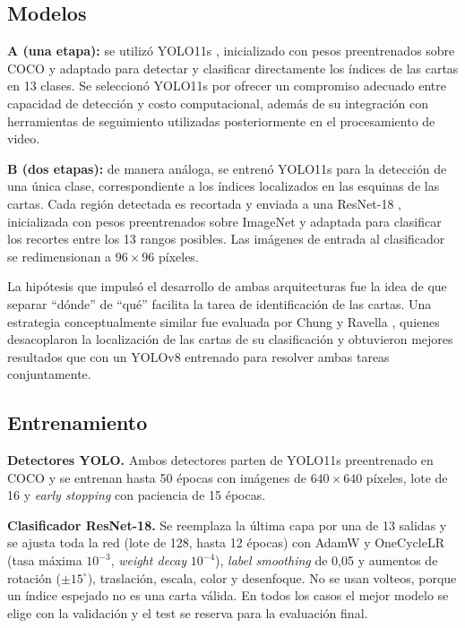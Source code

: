 \documentclass[conference,a4paper]{IEEEtran}
\begin{document}
\subsection{Modelos}
\textbf{A (una etapa):} se utilizó YOLO11s \cite{ultralytics2024,khanam2024}, inicializado con pesos preentrenados sobre COCO y adaptado para detectar y clasificar directamente los índices de las cartas en 13 clases. Se seleccionó YOLO11s por ofrecer un compromiso adecuado entre capacidad de detección y costo computacional, además de su integración con herramientas de seguimiento utilizadas posteriormente en el procesamiento de video.


\textbf{B (dos etapas):} de manera análoga, se entrenó YOLO11s para la detección de una única clase, correspondiente a los índices localizados en las esquinas de las cartas. Cada región detectada es recortada y enviada a una ResNet-18 \cite{he2016}, inicializada con pesos preentrenados sobre ImageNet y adaptada para clasificar los recortes entre los 13 rangos posibles. Las imágenes de entrada al clasificador se redimensionan a \(96 \times 96\) píxeles. 

La hipótesis que impulsó el desarrollo de ambas arquitecturas fue la idea de que separar ``dónde'' de ``qué'' facilita la tarea de identificación de las cartas. Una estrategia conceptualmente similar fue evaluada por Chung y Ravella \cite{chung2024}, quienes desacoplaron la localización de las cartas de su clasificación y obtuvieron mejores resultados que con un YOLOv8 entrenado para resolver ambas tareas conjuntamente.

\subsection{Entrenamiento}

\textbf{Detectores YOLO.} Ambos detectores parten de YOLO11s preentrenado en COCO y se entrenan hasta 50 épocas con imágenes de $640\times640$ píxeles, lote de 16 y \textit{early stopping} con paciencia de 15 épocas.

\textbf{Clasificador ResNet-18.} Se reemplaza la última capa por una de 13 salidas y se ajusta toda la red (lote de 128, hasta 12 épocas) con AdamW y OneCycleLR (tasa máxima $10^{-3}$, \textit{weight decay} $10^{-4}$), \textit{label smoothing} de 0,05 y aumentos de rotación ($\pm 15^\circ$), traslación, escala, color y desenfoque. No se usan volteos, porque un índice espejado no es una carta válida. En todos los casos el mejor modelo se elige con la validación y el test se reserva para la evaluación final.
\end{document}
